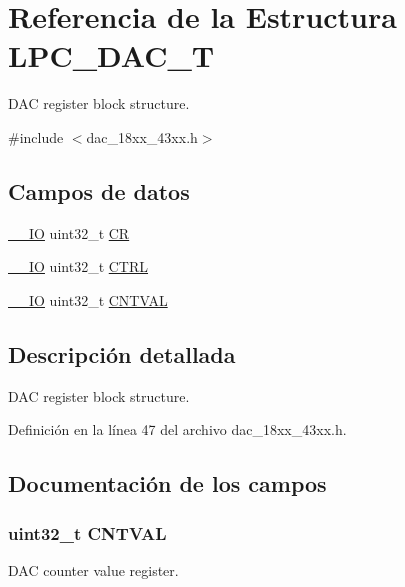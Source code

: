 \hypertarget{struct_l_p_c___d_a_c___t}{}\section{Referencia de la Estructura L\+P\+C\+\_\+\+D\+A\+C\+\_\+T}
\label{struct_l_p_c___d_a_c___t}


D\+AC register block structure.  




{\ttfamily \#include $<$dac\+\_\+18xx\+\_\+43xx.\+h$>$}

\subsection*{Campos de datos}
\begin{DoxyCompactItemize}
\item 
\hyperlink{core__sc300_8h_aec43007d9998a0a0e01faede4133d6be}{\+\_\+\+\_\+\+IO} uint32\+\_\+t \hyperlink{struct_l_p_c___d_a_c___t_ab40c89c59391aaa9d9a8ec011dd0907a}{CR}
\item 
\hyperlink{core__sc300_8h_aec43007d9998a0a0e01faede4133d6be}{\+\_\+\+\_\+\+IO} uint32\+\_\+t \hyperlink{struct_l_p_c___d_a_c___t_a15fc8d35f045f329b80c544bef35ff64}{C\+T\+RL}
\item 
\hyperlink{core__sc300_8h_aec43007d9998a0a0e01faede4133d6be}{\+\_\+\+\_\+\+IO} uint32\+\_\+t \hyperlink{struct_l_p_c___d_a_c___t_a23689413781c175230264d3973b88aa1}{C\+N\+T\+V\+AL}
\end{DoxyCompactItemize}


\subsection{Descripción detallada}
D\+AC register block structure. 

Definición en la línea 47 del archivo dac\+\_\+18xx\+\_\+43xx.\+h.



\subsection{Documentación de los campos}
\subsubsection[{\texorpdfstring{C\+N\+T\+V\+AL}{CNTVAL}}]{ uint32\+\_\+t C\+N\+T\+V\+AL}\hypertarget{struct_l_p_c___d_a_c___t_a23689413781c175230264d3973b88aa1}{}\label{struct_l_p_c___d_a_c___t_a23689413781c175230264d3973b88aa1}
D\+AC counter value register. 

